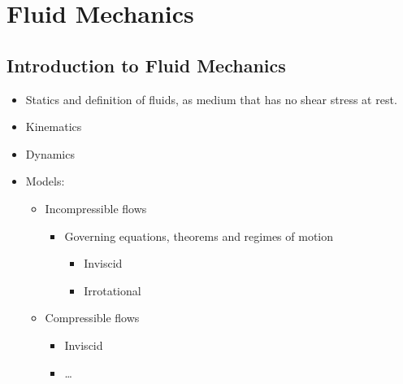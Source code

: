 \documentclass[letterpaper,10pt,english]{jupyterBook}
\begin{document}
\part{Fluid Mechanics}

\sphinxstepscope


\chapter{Introduction to Fluid Mechanics}
\label{\detokenize{ch/fluids/intro:introduction-to-fluid-mechanics}}\label{\detokenize{ch/fluids/intro:fluid-mechanics-intro}}\label{\detokenize{ch/fluids/intro::doc}}\begin{itemize}
\item {} 
\sphinxAtStartPar
Statics and definition of fluids, as medium that has no shear stress at rest.

\item {} 
\sphinxAtStartPar
Kinematics

\item {} 
\sphinxAtStartPar
Dynamics

\item {} 
\sphinxAtStartPar
Models:
\begin{itemize}
\item {} 
\sphinxAtStartPar
Incompressible flows
\begin{itemize}
\item {} 
\sphinxAtStartPar
Governing equations, theorems and regimes of motion
\begin{itemize}
\item {} 
\sphinxAtStartPar
Inviscid

\item {} 
\sphinxAtStartPar
Irrotational

\end{itemize}

\end{itemize}

\item {} 
\sphinxAtStartPar
Compressible flows
\begin{itemize}
\item {} 
\sphinxAtStartPar
Inviscid

\item {} 
\sphinxAtStartPar
…

\end{itemize}

\end{itemize}

\end{itemize}
\end{document}
